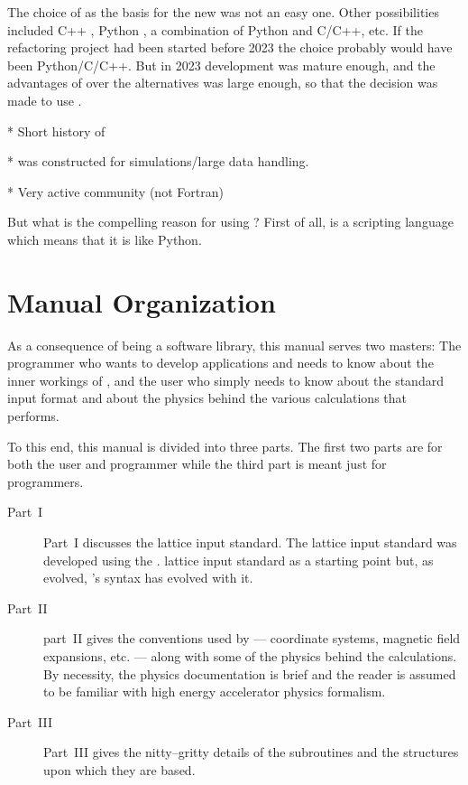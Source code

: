 The choice of \julia as the basis for the new \bmad was not an easy one. Other possibilities included
C++ \cite{}, Python \cite{}, a combination of Python and C/C++, etc. If the \bmad refactoring
project had been started before 2023 the choice probably would have been Python/C/C++. But in
2023 \julia development was mature enough, and the advantages of \julia over the alternatives was
large enough, so that the decision was made to use \julia.

* Short history of \julia

* \julia was constructed for simulations/large data handling.

* Very active community (not Fortran)

But what is the compelling reason for using \julia? First of all, \julia is a scripting language which
means that it is 
like Python. 

\section{Manual Organization}

As a consequence of \bmad being a software library, this manual serves two masters: The
programmer who wants to develop applications and needs to know about the inner workings of
\bmad, and the user who simply needs to know about the \bmad standard input format and
about the physics behind the various calculations that \bmad performs.

To this end, this manual is divided into three parts. The first two
parts are for both the user and programmer while the third part is
meant just for programmers. 
  \begin{description}
  \item[Part~I] \Newline
Part~I discusses the \bmad lattice input standard. The \bmad lattice input standard was
developed using the \mad\cite{b:maduser,b:madphysics}. lattice input standard as a
starting point but, as \bmad evolved, \bmad's syntax has evolved with it.
  \item[Part~II] \Newline
part~II gives the conventions used by \bmad --- coordinate systems, magnetic field
expansions, etc. --- along with some of the physics behind the calculations. By necessity,
the physics documentation is brief and the reader is assumed to be familiar with high
energy accelerator physics formalism.
  \item[Part~III] \Newline
Part~III gives the nitty--gritty details of the \bmad
subroutines and the structures upon which they are based.
\end{description}

